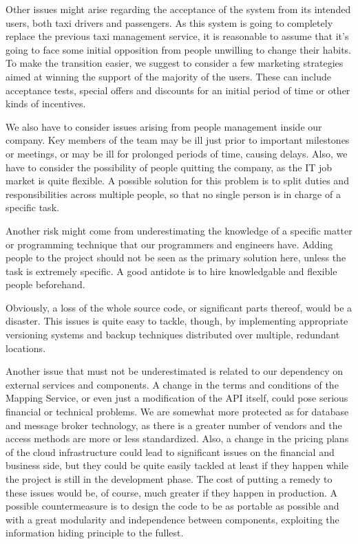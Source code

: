 Other issues might arise regarding the acceptance of the system from its intended users, both taxi drivers and passengers. As this system is going to completely replace the previous taxi management service, it is reasonable to assume that it's going to face some initial opposition from people unwilling to change their habits. To make the transition easier, we suggest to consider a few marketing strategies aimed at winning the support of the majority of the users. These can include acceptance tests, special offers and discounts for an initial period of time or other kinds of incentives. 

We also have to consider issues arising from people management inside our company. Key members of the team may be ill just prior to important milestones or meetings, or may be ill for prolonged periods of time, causing delays. Also, we have to consider the possibility of people quitting the company, as the IT job market is quite flexible. A possible solution for this problem is to split duties and responsibilities across multiple people, so that no single person is in charge of a specific task. 

Another risk might come from underestimating the knowledge of a specific matter or programming technique that our programmers and engineers have. Adding people to the project should not be seen as the primary solution here, unless the task is extremely specific. A good antidote is to hire knowledgable and flexible people beforehand.

Obviously, a loss of the whole source code, or significant parts thereof, would be a disaster. This issues is quite easy to tackle, though, by implementing appropriate versioning systems and backup techniques distributed over multiple, redundant locations.

Another issue that must not be underestimated is related to our dependency on external services and components. A change in the terms and conditions of the Mapping Service, or even just a modification of the API itself, could pose serious financial or technical problems. We are somewhat more protected as for database and message broker technology, as there is a greater number of vendors and the access methods are more or less standardized. Also, a change in the pricing plans of the cloud infrastructure could lead to significant issues on the financial and business side, but they could be quite easily tackled at least if they happen while the project is still in the development phase. The cost of putting a remedy to these issues would be, of course, much greater if they happen in production. A possible countermeasure is to design the code to be as portable as possible and with a great modularity and independence between components, exploiting the information hiding principle to the fullest. 

